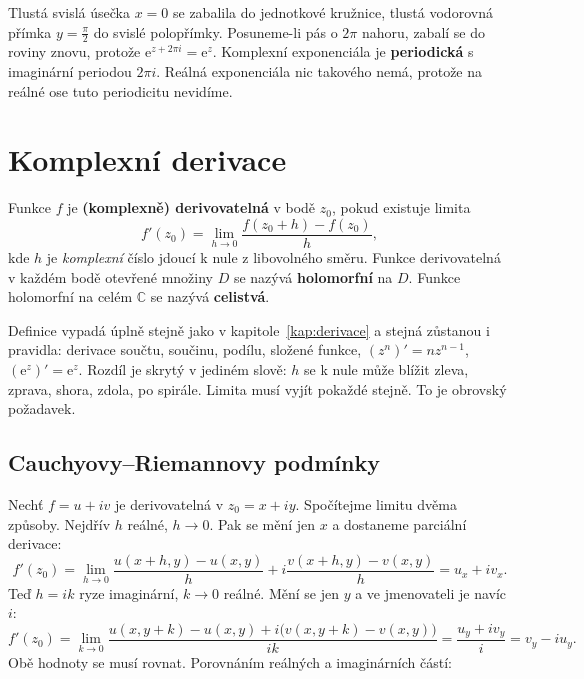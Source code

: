 Tlustá svislá úsečka $x = 0$ se zabalila do jednotkové kružnice, tlustá vodorovná přímka $y = \frac{\pi}{2}$ do svislé polopřímky. Posuneme-li pás o $2\pi$ nahoru, zabalí se do roviny znovu, protože $\mathrm{e}^{z + 2\pi i} = \mathrm{e}^z$. Komplexní exponenciála je \textbf{periodická} s imaginární periodou $2\pi i$. Reálná exponenciála nic takového nemá, protože na reálné ose tuto periodicitu nevidíme.

\section{Komplexní derivace}

\begin{definitionbox}
  Funkce $f$ je \textbf{(komplexně) derivovatelná} v bodě $z_0$, pokud existuje limita
  \begin{equation*}
    f'(z_0) = \lim_{h\to 0}\frac{f(z_0 + h) - f(z_0)}{h},
  \end{equation*}
  kde $h$ je \textit{komplexní} číslo jdoucí k nule z libovolného směru. Funkce derivovatelná v každém bodě otevřené množiny $D$ se nazývá \textbf{holomorfní} na $D$. Funkce holomorfní na celém $\mathbb{C}$ se nazývá \textbf{celistvá}.
\end{definitionbox}

Definice vypadá úplně stejně jako v kapitole~\ref{kap:derivace} a stejná zůstanou i pravidla: derivace součtu, součinu, podílu, složené funkce, $(z^n)' = nz^{n-1}$, $(\mathrm{e}^z)' = \mathrm{e}^z$. Rozdíl je skrytý v jediném slově: $h$ se k nule může blížit zleva, zprava, shora, zdola, po spirále. Limita musí vyjít pokaždé stejně. To je obrovský požadavek.

\subsection{Cauchyovy--Riemannovy podmínky}

Nechť $f = u + iv$ je derivovatelná v $z_0 = x + iy$. Spočítejme limitu dvěma způsoby. Nejdřív $h$ reálné, $h\to 0$. Pak se mění jen $x$ a dostaneme parciální derivace:
\begin{equation*}
  f'(z_0) = \lim_{h\to 0}\frac{u(x + h, y) - u(x, y)}{h} + i\frac{v(x + h, y) - v(x, y)}{h} = u_x + iv_x.
\end{equation*}
Teď $h = ik$ ryze imaginární, $k\to 0$ reálné. Mění se jen $y$ a ve jmenovateli je navíc $i$:
\begin{equation*}
  f'(z_0) = \lim_{k\to 0}\frac{u(x, y + k) - u(x, y) + i\big(v(x, y + k) - v(x, y)\big)}{ik} = \frac{u_y + iv_y}{i} = v_y - iu_y.
\end{equation*}
Obě hodnoty se musí rovnat. Porovnáním reálných a imaginárních částí:

